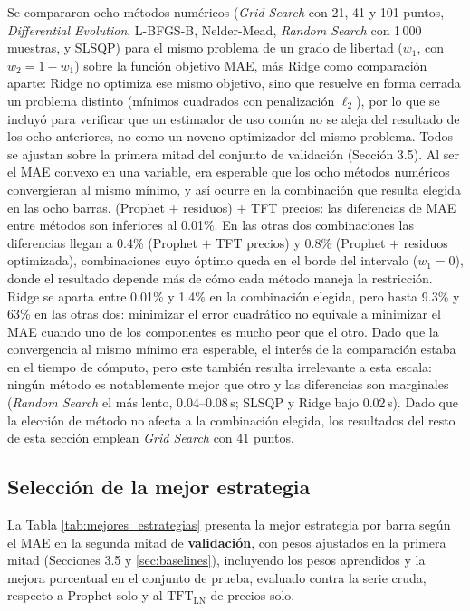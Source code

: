 Se compararon ocho métodos numéricos (\textit{Grid Search} con 21, 41 y 101 puntos, \textit{Differential Evolution}, L-BFGS-B, Nelder-Mead, \textit{Random Search} con 1\,000 muestras, y SLSQP) para el mismo problema de un grado de libertad ($w_1$, con $w_2=1-w_1$) sobre la función objetivo MAE, más Ridge como comparación aparte: Ridge no optimiza ese mismo objetivo, sino que resuelve en forma cerrada un problema distinto (mínimos cuadrados con penalización $\ell_2$), por lo que se incluyó para verificar que un estimador de uso común no se aleja del resultado de los ocho anteriores, no como un noveno optimizador del mismo problema. Todos se ajustan sobre la primera mitad del conjunto de validación (Sección 3.5). Al ser el MAE convexo en una variable, era esperable que los ocho métodos numéricos convergieran al mismo mínimo, y así ocurre en la combinación que resulta elegida en las ocho barras, (Prophet $+$ residuos) $+$ TFT precios: las diferencias de MAE entre métodos son inferiores al 0.01\%. En las otras dos combinaciones las diferencias llegan a 0.4\% (Prophet $+$ TFT precios) y 0.8\% (Prophet $+$ residuos optimizada), combinaciones cuyo óptimo queda en el borde del intervalo ($w_1=0$), donde el resultado depende más de cómo cada método maneja la restricción. Ridge se aparta entre 0.01\% y 1.4\% en la combinación elegida, pero hasta 9.3\% y 63\% en las otras dos: minimizar el error cuadrático no equivale a minimizar el MAE cuando uno de los componentes es mucho peor que el otro. Dado que la convergencia al mismo mínimo era esperable, el interés de la comparación estaba en el tiempo de cómputo, pero este también resulta irrelevante a esta escala: ningún método es notablemente mejor que otro y las diferencias son marginales (\textit{Random Search} el más lento, 0.04--0.08\,s; SLSQP y Ridge bajo 0.02\,s). Dado que la elección de método no afecta a la combinación elegida, los resultados del resto de esta sección emplean \textit{Grid Search} con 41 puntos.

\subsection{Selección de la mejor estrategia}

La Tabla \ref{tab:mejores_estrategias} presenta la mejor estrategia por barra según el MAE en la segunda mitad de \textbf{validación}, con pesos ajustados en la primera mitad (Secciones 3.5 y \ref{sec:baselines}), incluyendo los pesos aprendidos y la mejora porcentual en el conjunto de prueba, evaluado contra la serie cruda, respecto a Prophet solo y al $\text{TFT}_\text{LN}$ de precios solo.

